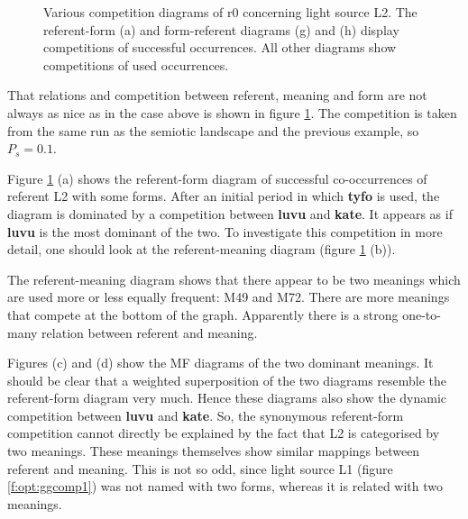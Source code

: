 \begin{figure}
\centering
{}
\caption{Various competition diagrams of r0 concerning light source L2. The referent-form (a) and form-referent diagrams (g) and (h) display competitions of successful occurrences. All other diagrams show competitions of used occurrences.}
\label{f:opt:ggcomp2}
\end{figure}

That relations and competition between referent, meaning and form are not always as nice as in the case above is shown in figure \ref{f:opt:ggcomp2}. The competition is taken from the same run as the semiotic landscape and the previous example, so $P_s=0.1$.

Figure \ref{f:opt:ggcomp2} (a) shows the referent-form diagram of successful co-occurrences of referent L2 with some forms. After an initial period in which {\bf tyfo} is used, the diagram is dominated by a competition between {\bf luvu} and {\bf kate}. It appears as if {\bf luvu} is the most dominant of the two. To investigate this competition in more detail, one should look at the referent-meaning diagram (figure \ref{f:opt:ggcomp2} (b)).

The referent-meaning diagram shows that there appear to be two meanings which are used more or less equally frequent: M49 and M72. There are more meanings that compete at the bottom of the graph. Apparently there is a strong one-to-many relation between referent and meaning. 

Figures (c) and (d) show the MF diagrams of the two dominant meanings. It should be clear that a weighted superposition of the two diagrams resemble the referent-form diagram very much. Hence these diagrams also show the dynamic competition between {\bf luvu} and {\bf kate}. So, the synonymous referent-form competition cannot directly be explained by the fact that L2 is categorised by two meanings. These meanings themselves show similar mappings between referent and meaning. This is not so odd, since light source L1 (figure \ref{f:opt:ggcomp1}) was not named with two forms, whereas it is related with two meanings.

